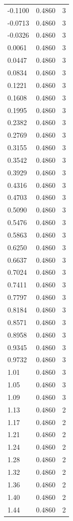 \begin{longtable}{lrr}
  -0.1100 & 0.4860 & 3 \\
  -0.0713 & 0.4860 & 3 \\
  -0.0326 & 0.4860 & 3 \\
  0.0061 & 0.4860 & 3 \\
  0.0447 & 0.4860 & 3 \\
  0.0834 & 0.4860 & 3 \\
  0.1221 & 0.4860 & 3 \\
  0.1608 & 0.4860 & 3 \\
  0.1995 & 0.4860 & 3 \\
  0.2382 & 0.4860 & 3 \\
  0.2769 & 0.4860 & 3 \\
  0.3155 & 0.4860 & 3 \\
  0.3542 & 0.4860 & 3 \\
  0.3929 & 0.4860 & 3 \\
  0.4316 & 0.4860 & 3 \\
  0.4703 & 0.4860 & 3 \\
  0.5090 & 0.4860 & 3 \\
  0.5476 & 0.4860 & 3 \\
  0.5863 & 0.4860 & 3 \\
  0.6250 & 0.4860 & 3 \\
  0.6637 & 0.4860 & 3 \\
  0.7024 & 0.4860 & 3 \\
  0.7411 & 0.4860 & 3 \\
  0.7797 & 0.4860 & 3 \\
  0.8184 & 0.4860 & 3 \\
  0.8571 & 0.4860 & 3 \\
  0.8958 & 0.4860 & 3 \\
  0.9345 & 0.4860 & 3 \\
  0.9732 & 0.4860 & 3 \\
  1.01 & 0.4860 & 3 \\
  1.05 & 0.4860 & 3 \\
  1.09 & 0.4860 & 3 \\
  1.13 & 0.4860 & 2 \\
  1.17 & 0.4860 & 2 \\
  1.21 & 0.4860 & 2 \\
  1.24 & 0.4860 & 2 \\
  1.28 & 0.4860 & 2 \\
  1.32 & 0.4860 & 2 \\
  1.36 & 0.4860 & 2 \\
  1.40 & 0.4860 & 2 \\
  1.44 & 0.4860 & 2 \\

\end{longtable}
